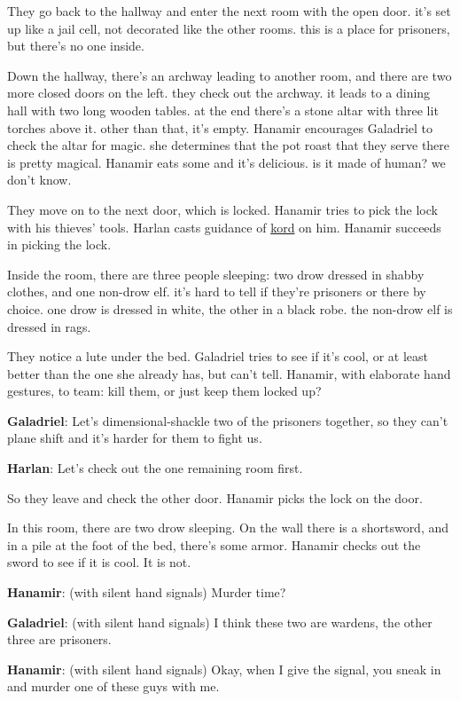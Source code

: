 \documentclass[smalldemyvopaper,11pt,twoside,onecolumn,openright,extrafontsizes]{memoir}
\begin{document}
They go back to the hallway and enter the next room with the open door.
it's set up like a jail cell, not decorated like the other rooms. this
is a place for prisoners, but there's no one inside.

Down the hallway, there's an archway leading to another room, and there
are two more closed doors on the left. they check out the archway. it
leads to a dining hall with two long wooden tables. at the end there's a
stone altar with three lit torches above it. other than that, it's
empty. Hanamir encourages Galadriel to check the altar for magic. she
determines that the pot roast that they serve there is pretty magical.
Hanamir eats some and it's delicious. is it made of human? we don't
know.

They move on to the next door, which is locked. Hanamir tries to pick
the lock with his thieves' tools. Harlan casts guidance of
\href{/characters/kord/}{kord} on him. Hanamir succeeds in picking the
lock.

Inside the room, there are three people sleeping: two drow dressed in
shabby clothes, and one non-drow elf. it's hard to tell if they're
prisoners or there by choice. one drow is dressed in white, the other in
a black robe. the non-drow elf is dressed in rags.

They notice a lute under the bed. Galadriel tries to see if it's cool,
or at least better than the one she already has, but can't tell.
Hanamir, with elaborate hand gestures, to team: kill them, or just keep
them locked up?

\textbf{Galadriel}: Let's dimensional-shackle two of the prisoners
together, so they can't plane shift and it's harder for them to fight
us.

\textbf{Harlan}: Let's check out the one remaining room first.

So they leave and check the other door. Hanamir picks the lock on the
door.

In this room, there are two drow sleeping. On the wall there is a
shortsword, and in a pile at the foot of the bed, there's some armor.
Hanamir checks out the sword to see if it is cool. It is not.

\textbf{Hanamir}: (with silent hand signals) Murder time?

\textbf{Galadriel}: (with silent hand signals) I think these two are
wardens, the other three are prisoners.

\textbf{Hanamir}: (with silent hand signals) Okay, when I give the
signal, you sneak in and murder one of these guys with me.
\end{document}
